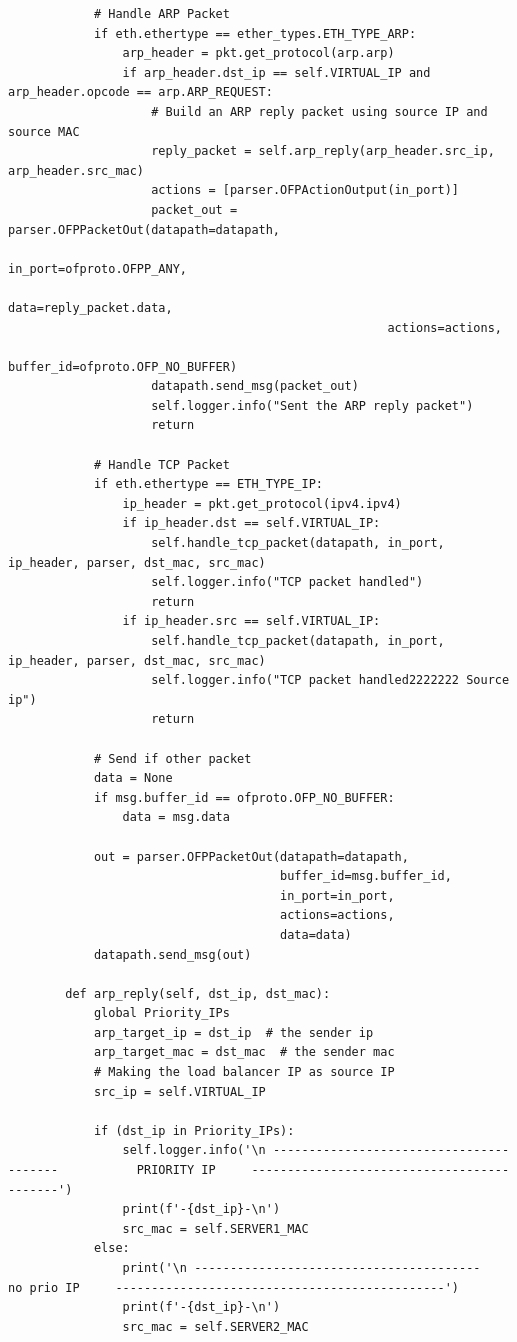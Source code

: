 \documentclass[a4paper,12pt]{article}
\begin{document}
\begin{verbatim}
            # Handle ARP Packet
            if eth.ethertype == ether_types.ETH_TYPE_ARP:
                arp_header = pkt.get_protocol(arp.arp)
                if arp_header.dst_ip == self.VIRTUAL_IP and arp_header.opcode == arp.ARP_REQUEST:
                    # Build an ARP reply packet using source IP and source MAC
                    reply_packet = self.arp_reply(arp_header.src_ip, arp_header.src_mac)
                    actions = [parser.OFPActionOutput(in_port)]
                    packet_out = parser.OFPPacketOut(datapath=datapath,
                                                     in_port=ofproto.OFPP_ANY,
                                                     data=reply_packet.data,
                                                     actions=actions,
                                                     buffer_id=ofproto.OFP_NO_BUFFER)
                    datapath.send_msg(packet_out)
                    self.logger.info("Sent the ARP reply packet")
                    return
    
            # Handle TCP Packet
            if eth.ethertype == ETH_TYPE_IP:
                ip_header = pkt.get_protocol(ipv4.ipv4)
                if ip_header.dst == self.VIRTUAL_IP:
                    self.handle_tcp_packet(datapath, in_port, ip_header, parser, dst_mac, src_mac)
                    self.logger.info("TCP packet handled")
                    return
                if ip_header.src == self.VIRTUAL_IP:
                    self.handle_tcp_packet(datapath, in_port, ip_header, parser, dst_mac, src_mac)
                    self.logger.info("TCP packet handled2222222 Source ip")
                    return
    
            # Send if other packet
            data = None
            if msg.buffer_id == ofproto.OFP_NO_BUFFER:
                data = msg.data
    
            out = parser.OFPPacketOut(datapath=datapath,
                                      buffer_id=msg.buffer_id,
                                      in_port=in_port,
                                      actions=actions,
                                      data=data)
            datapath.send_msg(out)
    
        def arp_reply(self, dst_ip, dst_mac):
            global Priority_IPs
            arp_target_ip = dst_ip  # the sender ip
            arp_target_mac = dst_mac  # the sender mac
            # Making the load balancer IP as source IP
            src_ip = self.VIRTUAL_IP
    
            if (dst_ip in Priority_IPs):
                self.logger.info('\n ----------------------------------------           PRIORITY IP     -------------------------------------------')
                print(f'-{dst_ip}-\n')
                src_mac = self.SERVER1_MAC
            else:
                print('\n ----------------------------------------           no prio IP     ----------------------------------------------')
                print(f'-{dst_ip}-\n')
                src_mac = self.SERVER2_MAC
    

\end{verbatim}
\end{document}
